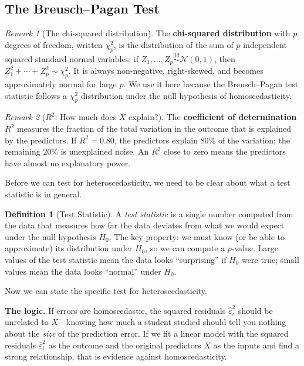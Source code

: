 \documentclass[11pt,a4paper]{article}
\theoremstyle{definition}
\newtheorem{definition}{Definition}[section]
\theoremstyle{plain}
\theoremstyle{remark}
\newtheorem{remark}{Remark}[section]
\begin{document}
\subsection{The Breusch--Pagan Test}\label{subsec:bp}

\begin{remark}[The chi-squared distribution]
The \textbf{chi-squared distribution} with $p$ degrees of freedom, written $\chi^2_p$, is the distribution of the sum of $p$ independent squared standard normal variables: if $Z_1, \ldots, Z_p \overset{\text{iid}}{\sim} \mathcal{N}(0,1)$, then $Z_1^2 + \cdots + Z_p^2 \sim \chi^2_p$. It is always non-negative, right-skewed, and becomes approximately normal for large $p$. We use it here because the Breusch--Pagan test statistic follows a $\chi^2_p$ distribution under the null hypothesis of homoscedasticity.
\end{remark}

\begin{remark}[$R^2$: How much does $X$ explain?]
The \textbf{coefficient of determination} $R^2$ measures the fraction of the total variation in the outcome that is explained by the predictors. If $R^2 = 0.80$, the predictors explain 80\% of the variation; the remaining 20\% is unexplained noise. An $R^2$ close to zero means the predictors have almost no explanatory power.
\end{remark}

Before we can test for heteroscedasticity, we need to be clear about what a test statistic is in general.

\begin{definition}[Test Statistic]
A \emph{test statistic} is a single number computed from the data that measures how far the data deviates from what we would expect under the null hypothesis $H_0$. The key property: we must know (or be able to approximate) its distribution under $H_0$, so we can compute a $p$-value. Large values of the test statistic mean the data looks ``surprising'' if $H_0$ were true; small values mean the data looks ``normal'' under $H_0$.
\end{definition}

Now we can state the specific test for heteroscedasticity.

\textbf{The logic.} If errors are homoscedastic, the squared residuals $\hat\varepsilon_i^2$ should be unrelated to $X$---knowing how much a student studied should tell you nothing about the \emph{size} of the prediction error. If we fit a linear model with the squared residuals $\hat\varepsilon_i^2$ as the outcome and the original predictors $X$ as the inputs and find a strong relationship, that is evidence against homoscedasticity.
\end{document}
